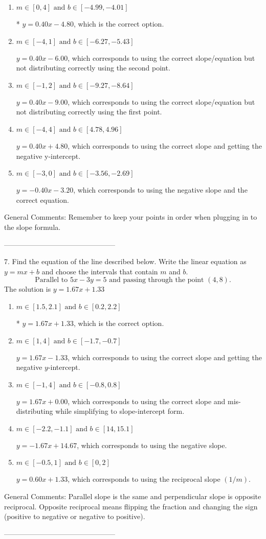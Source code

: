 \documentclass{article}[14pt]
\begin{document}
\begin{enumerate}[label=\Alph*.] 
\item $ m \in [0, 4] \text{ and } b \in [-4.99, -4.01] $ 

 * $y = 0.40x - 4.80$, which is the correct option. 
\item $ m \in [-4, 1] \text{ and } b \in [-6.27, -5.43] $ 

  $y = 0.40x - 6.00$, which corresponds to using the correct slope/equation but not distributing correctly using the second point. 
\item $ m \in [-1, 2] \text{ and } b \in [-9.27, -8.64] $ 

  $y = 0.40x - 9.00$, which corresponds to using the correct slope/equation but not distributing correctly using the first point. 
\item $ m \in [-4, 4] \text{ and } b \in [4.78, 4.96] $ 

  $y = 0.40x + 4.80$, which corresponds to using the correct slope and getting the negative y-intercept. 
\item $ m \in [-3, 0] \text{ and } b \in [-3.56, -2.69] $ 

  $y = -0.40x - 3.20$, which corresponds to using the negative slope and the correct equation. 
\end{enumerate} 
 
General Comments: Remember to keep your points in order when plugging in to the slope formula.

-----------------------------------------------

7. Find the equation of the line described below. Write the linear equation as $ y=mx+b $ and choose the intervals that contain $m$ and $b$.
$$ \text{Parallel to } 5 x - 3 y = 5 \text{ and passing through the point } (4, 8). $$ 
The solution is $ y = 1.67x + 1.33 $ 

\begin{enumerate}[label=\Alph*.] 
\item $ m \in [1.5, 2.1] \text{ and } b \in [0.2, 2.2] $ 

 * $y = 1.67x + 1.33$, which is the correct option. 
\item $ m \in [1, 4] \text{ and } b \in [-1.7, -0.7] $ 

  $y = 1.67x - 1.33$, which corresponds to using the correct slope and getting the negative $y$-intercept. 
\item $ m \in [-1, 4] \text{ and } b \in [-0.8, 0.8] $ 

  $y = 1.67x + 0.00$, which corresponds to using the correct slope and mis-distributing while simplifying to slope-intercept form. 
\item $ m \in [-2.2, -1.1] \text{ and } b \in [14, 15.1] $ 

  $y = -1.67x + 14.67$, which corresponds to using the negative slope. 
\item $ m \in [-0.5, 1] \text{ and } b \in [0, 2] $ 

  $y = 0.60x + 1.33$, which corresponds to using the reciprocal slope $(1/m)$. 
\end{enumerate} 
 
General Comments: Parallel slope is the same and perpendicular slope is opposite reciprocal. Opposite reciprocal means flipping the fraction and changing the sign (positive to negative or negative to positive).

-----------------------------------------------
\end{document}
